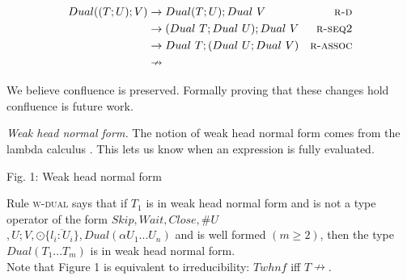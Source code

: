 \documentclass[sigplan]{acmart}
\newcommand{\srule}[1]{\textsc{#1}}
\begin{document}
 \begin{align*}
  \mathtt\mathit Dual (( T ; U ) ; V) & \rightarrow \mathtt\mathit Dual(T;U) ; Dual\ V & \srule{r-d}\\
  & \rightarrow \mathtt (Dual\ T ; Dual\ U ); Dual\ V & \srule{r-seq2}\\
  & \rightarrow \mathtt\mathit Dual\ T ; (Dual\ U ; Dual\ V) & \srule{r-assoc}\\
  & \nrightarrow
\end{align*}

We believe confluence is preserved. Formally proving that these changes hold confluence is future work.

\textit{Weak head normal form.   }
The notion of weak head normal form comes from the lambda calculus \cite{lambda, typefreelambda}. This lets us know when an expression is fully evaluated.


\begin{center}
    Fig. 1: Weak head normal form
\end{center}
\vspace{3mm}

Rule \srule{w-dual} says that if $T_1$ is in weak head normal form and is not a type operator of the form $Skip, Wait, Close, \#U$\\
$, U;V, \odot\{\overline{l_i: U_i}\}, Dual (\alpha U_1...U_n)$ and is well formed $(m \geq 2)$, then the type $Dual (T_1...T_m)$ is in weak head normal form. \\
Note that Figure 1 is equivalent to irreducibility: $T \mathit whnf$ iff $T \nrightarrow$.
\end{document}
